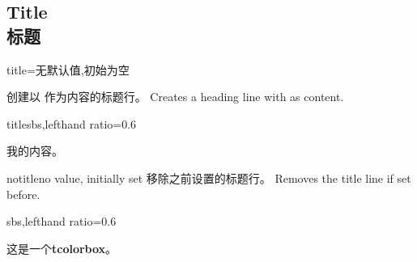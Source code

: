 \subsection{Title\\标题}%

\begin{docTcbKey}{title}{=}{无默认值,初始为空}

创建以  作为内容的标题行。\hfill
Creates a heading line with  as content.



\begin{exdispExample*}{title}{sbs,lefthand ratio=0.6}
\begin{tcolorbox}[title=我的标题]
我的内容。
\end{tcolorbox}
\end{exdispExample*}
\end{docTcbKey}

\begin{docTcbKey}{notitle}{}{no value, initially set}
移除之前设置的标题行。
\hfill
Removes the title line if set before.



\begin{dispExample*}{sbs,lefthand ratio=0.6}
\begin{tcolorbox}[title=我的标题行,notitle]
这是一个\textbf{tcolorbox}。
\end{tcolorbox}
\end{dispExample*}
\end{docTcbKey}

